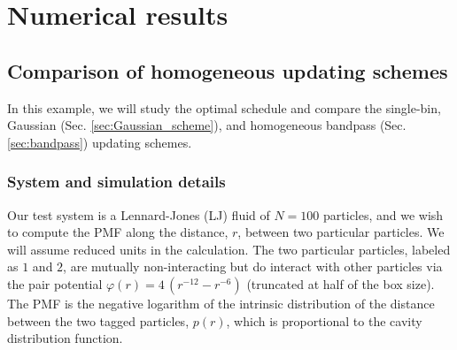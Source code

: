 \documentclass[reprint, superscriptaddress, floatfix]{revtex4-1}
\begin{document}
\section{\label{sec:results}
Numerical results}



\subsection{\label{sec:lj}
Comparison of homogeneous updating schemes}

In this example, we will study the optimal schedule
and compare the single-bin,
Gaussian (Sec. \ref{sec:Gaussian_scheme}),
and homogeneous bandpass (Sec. \ref{sec:bandpass})
updating schemes.

\subsubsection{System and simulation details}

Our test system is
a Lennard-Jones (LJ) fluid of $N = 100$ particles,
and we wish to compute the PMF along
the distance, $r$, between two particular particles.
%
We will assume reduced units in the calculation.
%
The two particular particles, labeled as $1$ and $2$,
are mutually non-interacting
but do interact with other particles
via the pair potential $\varphi(r) = 4 \, \left(r^{-12} - r^{-6}\right)$
(truncated at half of the box size).
%
The PMF is the negative logarithm of
the intrinsic distribution of the distance
between the two tagged particles, $p(r)$,
which is proportional to the cavity distribution function\cite{hansen}.
%
\end{document}
